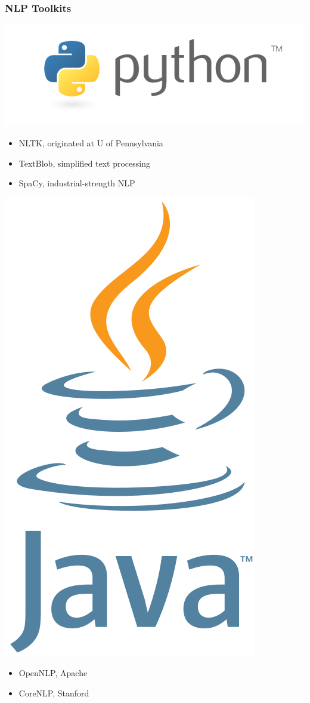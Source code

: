 \begin{frame}
    \frametitle{NLP Toolkits}
\includegraphics[scale=0.15]{img/logos/python}
        \begin{itemize}
        \item NLTK, originated at U of Pennsylvania
        \item TextBlob, simplified text processing
        \item SpaCy, industrial-strength NLP
    \end{itemize}

\vspace{15pt}
\hspace*{0.1cm}
\includegraphics[scale=0.05]{img/logos/java.png}
\vspace{-2pt}
    \begin{itemize}
        \item OpenNLP, Apache
        \item CoreNLP, Stanford
    \end{itemize}


\end{frame}
